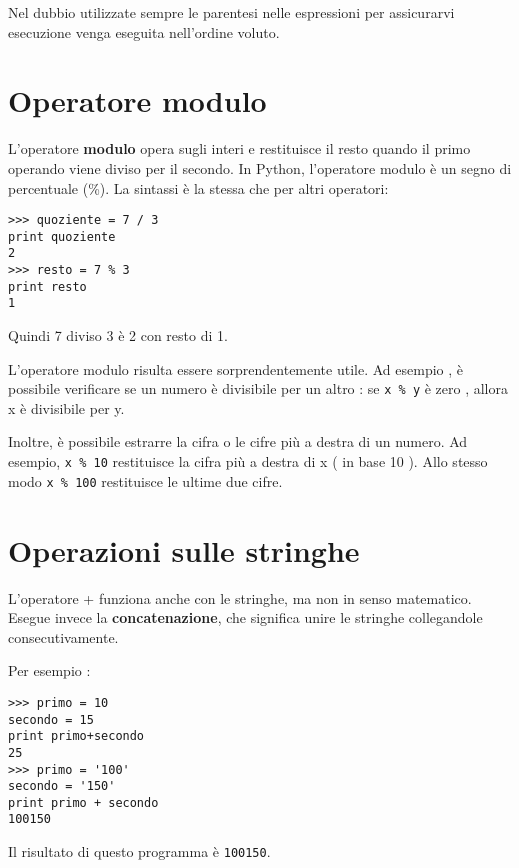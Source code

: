 Nel dubbio utilizzate sempre le parentesi nelle espressioni per assicurarvi esecuzione venga eseguita nell'ordine voluto.

\section{Operatore modulo}

 

L'operatore \textbf{modulo }opera sugli interi e restituisce il resto quando il primo operando viene diviso per il secondo. In Python, l'operatore modulo \`{e} un segno di percentuale (\%). La sintassi \`{e} la stessa che per altri operatori:

\beforeverb \begin{verbatim}
>>> quoziente = 7 / 3 
print quoziente
2
>>> resto = 7 % 3 
print resto
1 \end{verbatim} \afterverb
%
Quindi 7 diviso 3 \`{e} 2 con resto di 1.

L'operatore modulo risulta essere sorprendentemente utile. Ad esempio , \`{e} possibile verificare se un numero \`{e} divisibile per un altro : se {\tt x \% y} \`{e} zero , allora x \`{e} divisibile per y.


Inoltre, \`{e} possibile estrarre la cifra o le cifre pi\`{u} a destra di un numero. Ad esempio, {\tt x \% 10} restituisce la cifra pi\`{u} a destra di x ( in base 10 ). Allo stesso modo {\tt x \% 100} restituisce le ultime due cifre.


\section{Operazioni sulle stringhe} 

L'operatore + funziona anche con le stringhe, ma non in senso matematico. Esegue invece la \textbf{concatenazione}, che significa unire le stringhe collegandole consecutivamente. 

Per esempio :


\beforeverb \begin{verbatim}
>>> primo = 10 
secondo = 15 
print primo+secondo
25
>>> primo = '100' 
secondo = '150' 
print primo + secondo
100150 \end{verbatim} \afterverb
%
Il risultato di questo programma \`{e} {\tt 100150}.

